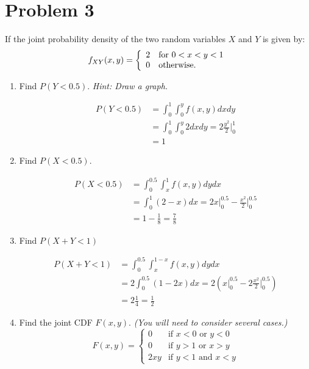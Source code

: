 \documentclass{article}
\newcommand{\1}{\mathbf{1}}
\begin{document}
\newpage
\section*{Problem 3} 
If the joint probability density of the two random variables $X$ and $Y$ is given by:
$$ f_{XY}(x,y) =\left\{
    \begin{array}{ll}
        2 & \hbox{for } 0 < x < y <1 \\
        0 & \hbox{otherwise.}
    \end{array}
\right.$$

\begin{enumerate}
    \item Find $P(Y<0.5)$. {\it Hint: Draw a graph.}  

    \begin{align*}
        P(Y<0.5) &= \int_0^1 \int_0^y f(x,y)dxdy \\
        &= \int_0^1 \int_0^y 2 dxdy = 2 \frac{y^2}{2}\bigg |_0^1 \\
        &= 1
    \end{align*}


    \item Find $P(X<0.5)$. 
    
    \begin{align*}
        P(X<0.5) &= \int_0^{0.5}\int_x^1 f(x,y)dydx \\
        &= \int_0^1 (2-x) dx = 2x|_0^{0.5} -  \frac{x^2}{2}\bigg |_0^{0.5} \\
        &= 1 - \frac{1}{8} = \frac{7}{8}
    \end{align*}
    
    
    \item Find $P(X+Y < 1)$ 
    
    \begin{align*}
        P(X+Y<1) &= \int_0^{0.5}\int_x^{1-x} f(x,y)dydx \\
        &= 2\int_0^{0.5} (1-2x) dx = 2\left(x|_0^{0.5} -  2\frac{x^2}{2}\bigg |_0^{0.5}\right) \\
        &= 2\frac{1}{4} = \frac{1}{2}
    \end{align*}
        
    
    \item Find the joint CDF $F(x,y)$. {\it (You will need to consider several cases.)}  
    $$F(x,y) = \begin{cases} 
	        0   &\mbox{if } x < 0 \mbox{ or } y<0   \\
	        0   &\mbox{if } y > 1 \mbox{ or } x > y \\
            2xy &\mbox{if } y < 1 \mbox{ and } x<y
        \end{cases}  
    $$
\end{enumerate}
\end{document}

